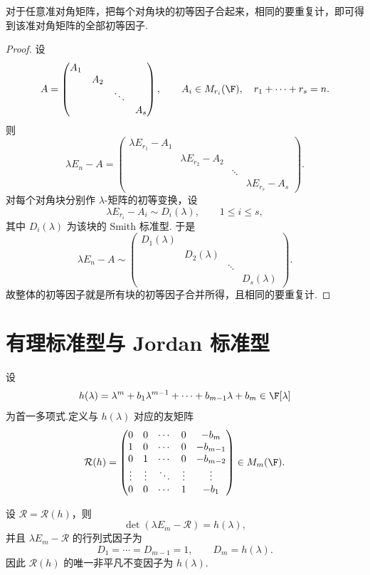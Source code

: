 \begin{corollary}
对于任意准对角矩阵，把每个对角块的初等因子合起来，相同的要重复计，即可得到该准对角矩阵的全部初等因子.
\end{corollary}

\begin{proof}
设
\[
A=\begin{pmatrix}
	A_1&&&\\
	&A_2&&\\
	&&\ddots&\\
	&&&A_s
\end{pmatrix},
\qquad
A_i\in M_{r_i}(\F),
\quad r_1+\cdots+r_s=n.
\]
则
\[
\lambda E_n-A=
\begin{pmatrix}
	\lambda E_{r_1}-A_1&&&\\
	&\lambda E_{r_2}-A_2&&\\
	&&\ddots&\\
	&&&\lambda E_{r_s}-A_s
\end{pmatrix}.
\]
对每个对角块分别作 $\lambda$-矩阵的初等变换，设
\[
\lambda E_{r_i}-A_i\sim D_i(\lambda),
\qquad 1\leq i\leq s,
\]
其中 $D_i(\lambda)$ 为该块的 Smith 标准型. 于是
\[
\lambda E_n-A
\sim
\begin{pmatrix}
	D_1(\lambda)&&&\\
	&D_2(\lambda)&&\\
	&&\ddots&\\
	&&&D_s(\lambda)
\end{pmatrix}.
\]
故整体的初等因子就是所有块的初等因子合并所得，且相同的要重复计.
\end{proof}

\section{有理标准型与 Jordan 标准型}

设
\[
h(\lambda)=\lambda^m+b_1\lambda^{m-1}+\cdots+b_{m-1}\lambda+b_m\in\F[\lambda]
\]
\label{p1:concept:c5-l2716}为首一多项式.定义与 $h(\lambda)$ 对应的友矩阵
\[
\mathcal{R}(h)=
\begin{pmatrix}
	0&0&\cdots&0&-b_m\\
	1&0&\cdots&0&-b_{m-1}\\
	0&1&\cdots&0&-b_{m-2}\\
	\vdots&\vdots&\ddots&\vdots&\vdots\\
	0&0&\cdots&1&-b_1
\end{pmatrix}\in M_m(\F).
\]


\begin{lemma}
	设 $\mathcal{R}=\mathcal{R}(h)$，则
	\[
	\det(\lambda E_m-\mathcal{R})=h(\lambda),
	\]
	并且 $\lambda E_m-\mathcal{R}$ 的行列式因子为
	\[
	D_1=\cdots=D_{m-1}=1,\qquad D_m=h(\lambda).
	\]
	因此 $\mathcal{R}(h)$ 的唯一非平凡不变因子为 $h(\lambda)$.
\end{lemma}

